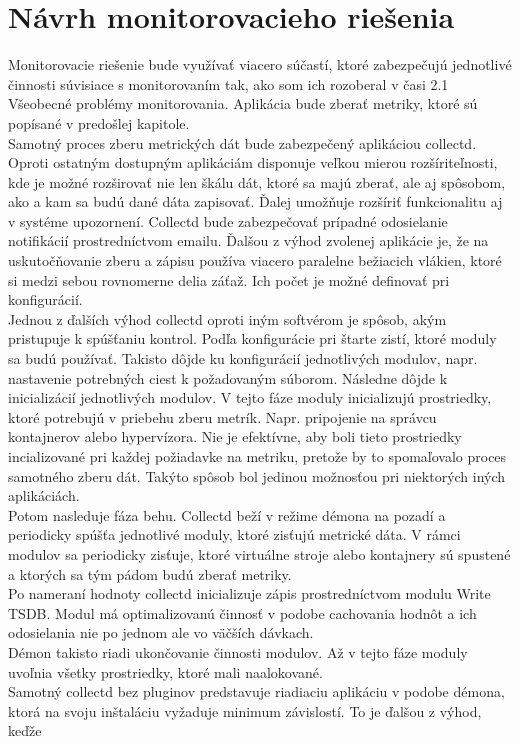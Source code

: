 \documentclass[12pt,twoside,color,cover,table]{fithesis3}
\begin{document}
\section{Návrh monitorovacieho riešenia}
Monitorovacie riešenie bude využívať viacero súčastí, ktoré zabezpečujú jednotlivé činnosti súvisiace s monitorovaním tak, ako som ich rozoberal v časi 2.1 Všeobecné problémy monitorovania.
Aplikácia bude zberať metriky, ktoré sú popísané v predošlej kapitole. 
\\Samotný proces zberu metrických dát bude zabezpečený aplikáciou collectd. Oproti ostatným dostupným aplikáciám disponuje
veľkou mierou rozšíriteľnosti, kde je možné rozširovať nie len škálu dát, ktoré sa majú zberať, ale aj spôsobom, ako a kam sa budú dané dáta zapisovať. Ďalej umožňuje rozšíriť funkcionalitu
aj v systéme upozornení. Collectd bude zabezpečovať prípadné odosielanie notifikácií prostredníctvom emailu. Ďalšou z výhod zvolenej aplikácie je, že na uskutočňovanie zberu a zápisu používa viacero
paralelne bežiacich vlákien, ktoré si medzi sebou rovnomerne delia záťaž. Ich počet je možné definovať pri konfigurácií. 
\\Jednou z ďalších výhod collectd oproti iným softvérom je spôsob, akým pristupuje k spúšťaniu kontrol. Podľa konfigurácie pri štarte zistí, ktoré moduly sa budú používať. Takisto dôjde ku konfigurácií 
jednotlivých modulov, napr. nastavenie potrebných ciest k požadovaným súborom. Následne dôjde k inicializácií jednotlivých modulov. V tejto fáze moduly inicializujú prostriedky, ktoré potrebujú v priebehu 
zberu metrík. Napr. pripojenie na správcu kontajnerov alebo hypervízora. Nie je efektívne, aby boli tieto prostriedky incializované pri
každej požiadavke na metriku, pretože by to spomaľovalo proces samotného zberu dát. Takýto spôsob bol jedinou možnosťou pri niektorých iných aplikáciách.
\\Potom nasleduje fáza behu. Collectd beží v režime démona na pozadí a periodicky spúšťa jednotlivé moduly, ktoré zisťujú metrické dáta. 
V rámci modulov sa periodicky zisťuje, ktoré virtuálne stroje alebo kontajnery sú spustené a ktorých sa tým pádom budú zberať metriky. 
\\Po nameraní hodnoty collectd inicializuje zápis prostredníctvom modulu Write TSDB. Modul má optimalizovanú činnosť v podobe cachovania
hodnôt a ich odosielania nie po jednom ale vo väčších dávkach.
\\Démon takisto riadi ukončovanie činnosti modulov. Až v tejto fáze moduly uvoľnia všetky prostriedky, ktoré mali naalokované.
\\Samotný collectd bez pluginov predstavuje riadiaciu aplikáciu v podobe démona, ktorá na svoju inštaláciu vyžaduje minimum závislostí. To je ďalšou z výhod, keďže 
\end{document}
